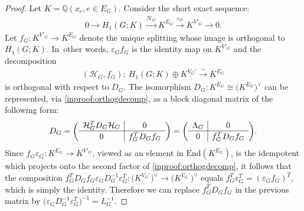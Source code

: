 \documentclass[pdftex]{sigma}%
\numberwithin{equation}{section}
\newcommand{\To}{\longrightarrow}
\newcommand{\Q}{\mathbb Q}
\newcommand{\0}{\color{blue}{\mathsf{0}}}
\begin{document}
\begin{proof} Let $K=\Q(x_e,e\in E_G)$.
Consider the short exact sequence:
\begin{gather*}
0 \To H_1(G; K) \overset{\mathcal{H}_G}{\To} K^{E_G} \overset{\varepsilon_G}{\To} K^{V'_G} \To 0.
\end{gather*}
Let $f_G\colon K^{V'_G} \rightarrow K^{E_G}$ denote the unique splitting whose image is orthogonal to $H_1(G;K)$. In~other words, $\varepsilon_G f_G$ is the identity map on $K^{V'_G}$ and the decomposition
\begin{gather} \label{inproof:orthogdecomp}
(\mathcal{H}_G, f_G) \colon\ H_1(G; K) \oplus K^{V_G'} \overset{\sim}{\To} K^{E_G}
\end{gather}
is orthogonal with respect to $D_G$.
The isomorphism $D_G\colon K^{E_G} \cong \big(K^{E_G}\big)^{\vee}$
can be represented, via \eqref{inproof:orthogdecomp}, as a block diagonal matrix of the following form:
\begin{gather*}
 D_G = \left(\begin{array}{c|c}
 \mathcal{H}_G^T D_G \mathcal{H}_G & 0 \\ \hline
 0 & f_G^{T^{\vphantom{1}}} D_G f_G \\
\end{array}
\right) = \left(
\begin{array}{c|c}
 \Lambda_G & 0 \\ \hline
 0 & f_G^{T^{\vphantom{1}}} D_G f_G \\
\end{array}\right)\!.
\end{gather*}
Since $f_G \varepsilon_G\colon K^{E_G} \rightarrow K^{V'_G}$, viewed as an element in $\mathrm{End}(K^{E_G})$, is the idempotent which projects onto the second factor of \eqref{inproof:orthogdecomp}, it follows that the composition
$f_G^T D_G f_G \varepsilon_G D_G^{-1} \varepsilon_G^T\colon \big(K^{V_G'}\big)^{\vee} \rightarrow \big(K^{V_G'}\big)^{\vee}$ equals $f_G^T\varepsilon^T_G =(\varepsilon_G f_G)^T$, which is simply the identity. Therefore we can replace $f_G^T D_G f_G$ in the previous matrix by $\big(\varepsilon_G D_G^{-1} \varepsilon_G^T\big)^{-1} = L_G^{-1}$.
\end{proof}
\end{document}
